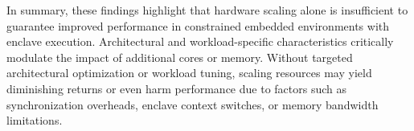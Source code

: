 



In summary, these findings highlight that hardware scaling alone is insufficient to guarantee improved performance in constrained embedded environments with enclave execution. Architectural and workload-specific characteristics critically modulate the impact of additional cores or memory. Without targeted architectural optimization or workload tuning, scaling resources may yield diminishing returns or even harm performance due to factors such as synchronization overheads, enclave context switches, or memory bandwidth limitations.

